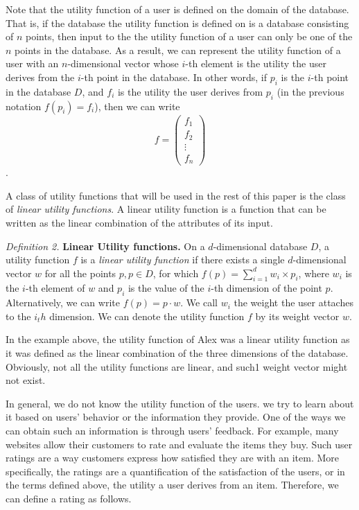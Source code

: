 Note that the utility function of a user is defined on the domain of the database. That is, if the database the utility function is defined on is a database consisting of $n$ points, then input to the the utility function of a user can only be one of the $n$ points in the database. As a result, we can represent the utility function of a user with an $n$-dimensional vector whose $i$-th element is the utility the user derives from the $i$-th point in the database. In other words, if $p_i$ is the $i$-th point in the database $D$, and $f_i$ is the utility the user derives from $p_i$ (in the previous notation $f(p_i) = f_i$), then we can write
\[f = \left( \begin{array}{c}
f_1 \\
f_2 \\
\vdots\\
f_n \end{array} \right)\].

A class of utility functions that will be used in the rest of this paper is the class of \textit{linear utility functions}. A linear utility function is a function that can be written as the linear combination of the attributes of its input.  

\medskip
\indent \textit{Definition 2.}  \textbf{Linear Utility functions.} On a $d$-dimensional database $D$, a utility function $f$ is a \textit{linear utility function} if there exists a single $d$-dimensional vector $w$ for all the points $p, p \in D$, for which $f(p) = \sum_{i = 1}^{d} w_i \times p_i$, where $w_i$ is the $i$-th element of $w$ and $p_i$ is the value of the $i$-th dimension of the point $p$. Alternatively, we can write $f(p) = p\cdot w$. We call $w_i$ the weight the user attaches to the $i_th$ dimension. We can denote the utility function $f$ by its weight vector $w$.
\medskip

In the example above, the utility function of Alex was a linear utility function as it was defined as the linear combination of the three dimensions of the database. Obviously, not all the utility functions are linear, and such1 weight vector might not exist.

In general, we do not know the utility function of the users. we try to learn about it based on users' behavior or the information they provide. One of the ways we can obtain such an information is through users' feedback. For example, many websites allow their customers to rate and evaluate the items they buy. Such user ratings are a way customers express how satisfied they are with an item. More specifically, the ratings are a quantification of the satisfaction of the users, or in the terms defined above, the utility a user derives from an item. Therefore, we can define a rating as follows.

